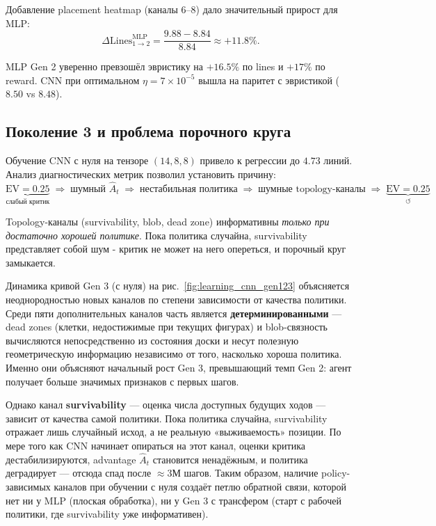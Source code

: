 \documentclass[12pt, a4paper]{article}
\begin{document}
Добавление placement heatmap (каналы 6--8) дало значительный прирост для MLP:
\begin{equation}
  \Delta\text{Lines}^{\text{MLP}}_{1\to2} = \frac{9.88 - 8.84}{8.84} \approx +11.8\%.
\end{equation}

MLP Gen 2 уверенно превзошёл эвристику на $+16.5\%$ по lines и $+17\%$ по reward. CNN при оптимальном $\eta = 7\times10^{-5}$ вышла на паритет с эвристикой ($8.50$ vs $8.48$).

\subsection{Поколение 3 и проблема порочного круга}

Обучение CNN с нуля на тензоре $(14, 8, 8)$ привело к регрессии до $4.73$ линий. Анализ диагностических метрик позволил установить причину:
\begin{equation}
  \underbrace{\text{EV}=0.25}_{\text{слабый критик}}
  \;\Rightarrow\;
  \text{шумный }\hat{A}_t
  \;\Rightarrow\;
  \text{нестабильная политика}
  \;\Rightarrow\;
  \text{шумные topology-каналы}
  \;\Rightarrow\;
  \underbrace{\text{EV}=0.25}_{\circlearrowleft}
\end{equation}

Topology-каналы (survivability, blob, dead zone) информативны \textit{только при достаточно хорошей политике}. Пока политика случайна, survivability представляет собой шум - критик не может на него опереться, и порочный круг замыкается.

Динамика кривой Gen 3 (с нуля) на рис.~\ref{fig:learning_cnn_gen123} объясняется неоднородностью новых каналов по степени зависимости от качества политики. Среди пяти дополнительных каналов часть является \textbf{детерминированными} --- dead zones (клетки, недостижимые при текущих фигурах) и blob-связность вычисляются непосредственно из состояния доски и несут полезную геометрическую информацию независимо от того, насколько хороша политика. Именно они объясняют начальный рост Gen 3, превышающий темп Gen 2: агент получает больше значимых признаков с первых шагов.

Однако канал \textbf{survivability} --- оценка числа доступных будущих ходов --- зависит от качества самой политики. Пока политика случайна, survivability отражает лишь случайный исход, а не реальную «выживаемость» позиции. По мере того как CNN начинает опираться на этот канал, оценки критика дестабилизируются, advantage $\hat{A}_t$ становится ненадёжным, и политика деградирует --- отсюда спад после $\approx$3М шагов. Таким образом, наличие policy-зависимых каналов при обучении с нуля создаёт петлю обратной связи, которой нет ни у MLP (плоская обработка), ни у Gen 3 с трансфером (старт с рабочей политики, где survivability уже информативен).
\end{document}
